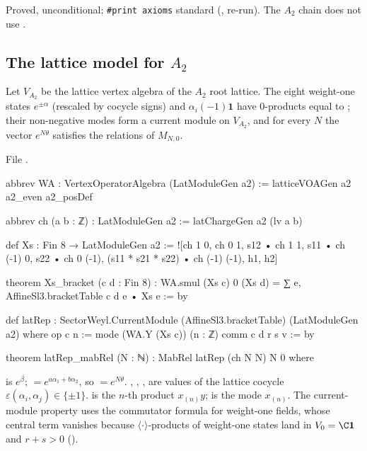 \begin{status}
Proved, unconditional; \texttt{\#print axioms} standard (,
 re-run). The $A_2$ chain does not use .
\end{status}

\subsection{The lattice model for $A_2$}

\begin{theorem}\label{l26:thm:latrep}
Let $V_{A_2}$ be the lattice vertex algebra of the $A_2$ root lattice. The eight weight-one states
$e^{\pm\alpha}$ (rescaled by cocycle signs) and $\alpha_i(-1)\mathbf 1$ have $0$-products equal to ; their
non-negative modes form a current module  on $V_{A_2}$, and for every $N$ the vector $e^{N\theta}$ satisfies the
relations of $M_{N,0}$.
\end{theorem}
\noindent File .
\begin{leancode}
abbrev WA : VertexOperatorAlgebra (LatModuleGen a2) := latticeVOAGen a2 a2_even a2_posDef

abbrev ch (a b : ℤ) : LatModuleGen a2 := latChargeGen a2 (lv a b)

def Xs : Fin 8 → LatModuleGen a2 :=
  ![ch 1 0, ch 0 1, s12 • ch 1 1, s11 • ch (-1) 0, s22 • ch 0 (-1),
    (s11 * s21 * s22) • ch (-1) (-1), h1, h2]

theorem Xs_bracket (c d : Fin 8) :
    WA.smul (Xs c) 0 (Xs d) = ∑ e, AffineSl3.bracketTable c d e • Xs e := by

def latRep : SectorWeyl.CurrentModule (AffineSl3.bracketTable) (LatModuleGen a2) where
  op c n := mode (WA.Y (Xs c)) (n : ℤ)
  comm c d r s v := by
\end{leancode}
\begin{leancode}
theorem latRep_mabRel (N : ℕ) : MabRel latRep (ch N N) N 0 where
\end{leancode}

\begin{dictionary}
 is $e^\beta$; $=e^{a\alpha_1+b\alpha_2}$, so $=e^{N\theta}$. , ,
,  are values of the lattice cocycle $\varepsilon(\alpha_i,\alpha_j)\in\{\pm1\}$.  is the
$n$-th product $x_{(n)}y$;  is the mode $x_{(n)}$. The current-module property uses the commutator
formula for weight-one fields, whose central term vanishes because $\langle\cdot\rangle$-products of weight-one states land in
$V_0=\C\mathbf 1$ and $r+s>0$ ().
\end{dictionary}

